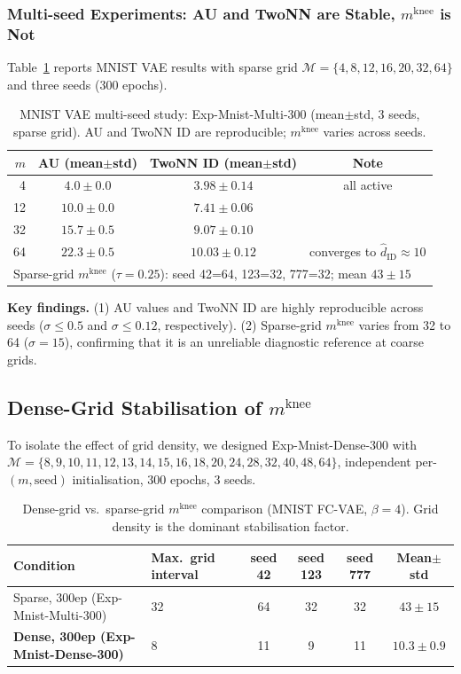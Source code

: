 \documentclass[11pt,a4paper]{article}
\newcommand{\mknee}{m^{\mathrm{knee}}}
\newcommand{\hatdID}{\hat{d}_{\mathrm{ID}}}
\begin{document}
\subsubsection{Multi-seed Experiments: AU and TwoNN are Stable, $\mknee$ is Not}
\label{sec:exp_multiseed}

Table~\ref{tab:multiseed_300} reports MNIST VAE results with sparse grid
$\mathcal{M}=\{4,8,12,16,20,32,64\}$ and three seeds (300 epochs).

\begin{table}[ht]
\centering
\caption{MNIST VAE multi-seed study: Exp-Mnist-Multi-300 (mean$\pm$std, 3 seeds, sparse grid).
AU and TwoNN ID are reproducible; $\mknee$ varies across seeds.}
\label{tab:multiseed_300}
\small
\begin{tabular}{rccc}
\toprule
$m$ & AU (mean$\pm$std) & TwoNN ID (mean$\pm$std) & Note \\
\midrule
4  & $4.0\pm0.0$ & $3.98\pm0.14$ & all active \\
12 & $10.0\pm0.0$ & $7.41\pm0.06$ & \\
32 & $15.7\pm0.5$ & $9.07\pm0.10$ & \\
64 & $22.3\pm0.5$ & $\mathbf{10.03\pm0.12}$ & converges to $\hatdID\approx10$ \\
\midrule
\multicolumn{4}{l}{Sparse-grid $\mknee$ ($\tau=0.25$):
seed 42=64, 123=32, 777=32; mean $43\pm15$} \\
\bottomrule
\end{tabular}
\end{table}

\textbf{Key findings.}
(1) AU values and TwoNN ID are highly reproducible across seeds
($\sigma\leq0.5$ and $\sigma\leq0.12$, respectively).
(2) Sparse-grid $\mknee$ varies from 32 to 64 ($\sigma=15$), confirming that
it is an unreliable diagnostic reference at coarse grids.

\subsection{Dense-Grid Stabilisation of $\mknee$}\label{sec:exp_dense}

To isolate the effect of grid density, we designed
Exp-Mnist-Dense-300 with
$\mathcal{M}=\{8,9,10,11,12,13,14,15,16,18,20,24,28,32,40,48,64\}$,
independent per-$(m,\text{seed})$ initialisation, 300 epochs, 3 seeds.

\begin{table}[ht]
\centering
\caption{Dense-grid vs.\ sparse-grid $\mknee$ comparison (MNIST FC-VAE, $\beta=4$).
Grid density is the dominant stabilisation factor.}
\label{tab:el_mknee}
\small
\begin{tabularx}{\linewidth}{lXcccc}
\toprule
Condition & Max.\ grid interval & seed 42 & seed 123 & seed 777 & Mean$\pm$std \\
\midrule
Sparse, 300ep (Exp-Mnist-Multi-300) & 32 & 64 & 32 & 32 & $43\pm15$ \\
\textbf{Dense, 300ep (Exp-Mnist-Dense-300)} & 8 & 11 & 9 & 11 & $\boldsymbol{10.3\pm0.9}$ \\
\bottomrule
\end{tabularx}
\end{table}
\end{document}
